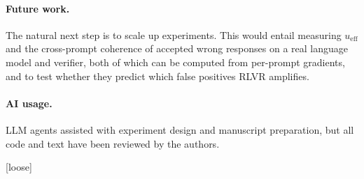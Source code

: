 \documentclass{article}
\theoremstyle{definition}
\newcommand{\ueff}{u_{\mathrm{eff}}}
\begin{document}
\paragraph{Future work.} The natural next step is to scale up experiments. This would entail measuring $\ueff$ and the cross-prompt coherence of accepted wrong responses on a real language model and verifier, both of which can be computed from per-prompt gradients, and to test whether they predict which false positives RLVR amplifies.

\paragraph{AI usage.} LLM agents assisted with experiment design and manuscript preparation, but all code and text have been reviewed by the authors.

[loose]




\appendix

\end{document}
